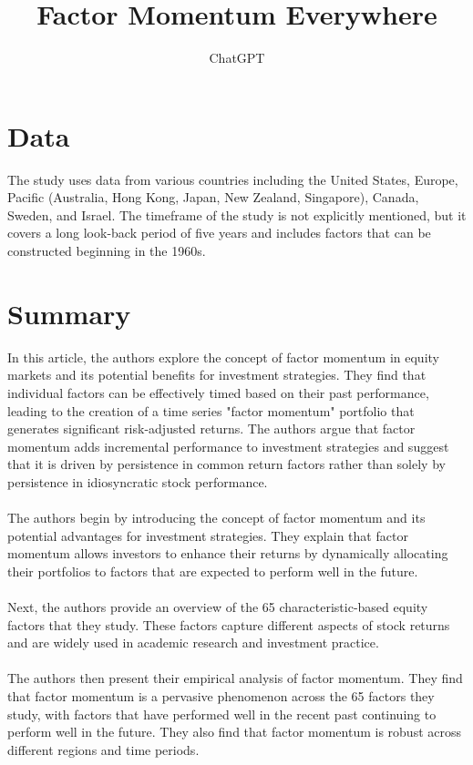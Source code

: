 \documentclass{article}
\title{Factor Momentum Everywhere}
\author{ChatGPT}
\begin{document}
 

\maketitle
\section{Data}
The study uses data from various countries including the United States, Europe, Pacific (Australia, Hong Kong, Japan, New Zealand, Singapore), Canada, Sweden, and Israel. The timeframe of the study is not explicitly mentioned, but it covers a long look-back period of five years and includes factors that can be constructed beginning in the 1960s. 
\section{Summary}
In this article, the authors explore the concept of factor momentum in equity markets and its potential benefits for investment strategies. They find that individual factors can be effectively timed based on their past performance, leading to the creation of a time series "factor momentum" portfolio that generates significant risk-adjusted returns. The authors argue that factor momentum adds incremental performance to investment strategies and suggest that it is driven by persistence in common return factors rather than solely by persistence in idiosyncratic stock performance. \\
\\
The authors begin by introducing the concept of factor momentum and its potential advantages for investment strategies. They explain that factor momentum allows investors to enhance their returns by dynamically allocating their portfolios to factors that are expected to perform well in the future. \\
\\
Next, the authors provide an overview of the 65 characteristic-based equity factors that they study. These factors capture different aspects of stock returns and are widely used in academic research and investment practice. \\
\\
The authors then present their empirical analysis of factor momentum. They find that factor momentum is a pervasive phenomenon across the 65 factors they study, with factors that have performed well in the recent past continuing to perform well in the future. They also find that factor momentum is robust across different regions and time periods. \\
\end{document}
